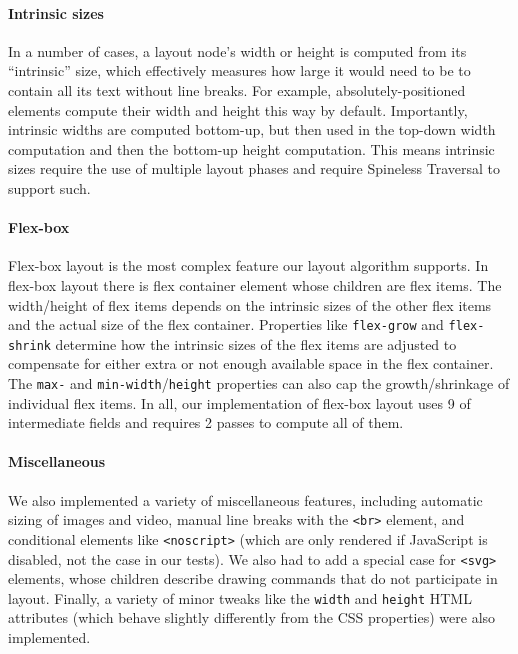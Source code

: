 \paragraph{Intrinsic sizes}
In a number of cases,
  a layout node's width or height is computed from
  its ``intrinsic'' size,
  which effectively measures how large it would need to be
  to contain all its text without line breaks.
For example, absolutely-positioned elements
  compute their width and height this way by default.
Importantly, intrinsic widths are computed bottom-up,
  but then used in the top-down width computation
  and then the bottom-up height computation.
This means intrinsic sizes require the use of
  multiple layout phases
  and require Spineless Traversal to support such.

\paragraph{Flex-box}
Flex-box layout is the most complex feature
  our layout algorithm supports.
In flex-box layout there is flex container element
  whose children are flex items.
The width/height of flex items depends on
  the intrinsic sizes of the other flex items and
  the actual size of the flex container.
Properties like \texttt{flex-grow} and \texttt{flex-shrink}
  determine how the intrinsic sizes of the flex items
  are adjusted to compensate for either extra or not enough
  available space in the flex container.
The \texttt{max-} and \texttt{min-width}/\texttt{height} properties
  can also cap the growth/shrinkage of individual flex items.
In all, our implementation of flex-box layout
  uses 9 of intermediate fields
  and requires 2 passes to compute all of them.

\paragraph{Miscellaneous}
We also implemented a variety of miscellaneous features,
  including automatic sizing of images and video,
  manual line breaks with the \texttt{<br>} element,
  and conditional elements like \texttt{<noscript>}
  (which are only rendered if JavaScript is disabled,
  not the case in our tests).
We also had to add a special case for \texttt{<svg>} elements,
  whose children describe drawing commands
  that do not participate in layout.
Finally, a variety of minor tweaks
  like the \texttt{width} and \texttt{height} HTML attributes
  (which behave slightly differently from the CSS properties)
  were also implemented.

